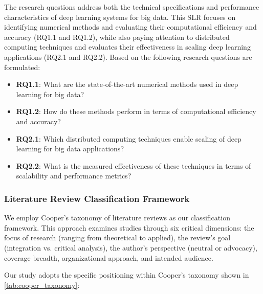 \documentclass[acmsmall]{acmart}
\begin{document}
The research questions address both the technical specifications and performance characteristics of deep learning systems for big data. This SLR focuses on identifying numerical methods and evaluating their computational efficiency and accuracy (RQ1.1 and RQ1.2), while also paying attention to distributed computing techniques and evaluates their effectiveness in scaling deep learning applications (RQ2.1 and RQ2.2). Based on the following research questions are formulated:

\begin{itemize}
    \item \textbf{RQ1.1}: What are the state-of-the-art numerical methods used in deep learning for big data?
    \item \textbf{RQ1.2}: How do these methods perform in terms of computational efficiency and accuracy?
    \item \textbf{RQ2.1}: Which distributed computing techniques enable scaling of deep learning for big data applications?
    \item \textbf{RQ2.2}: What is the measured effectiveness of these techniques in terms of scalability and performance metrics?
\end{itemize}



\subsubsection{Literature Review Classification Framework}\label{subsubsec:phase-1-planning-and-protocol-development:literature-review-classification-framework}
We employ Cooper's taxonomy of literature reviews \citep{cooper1988organizing} as our classification framework. This approach examines studies through six critical dimensions: the focus of research (ranging from theoretical to applied), the review's goal (integration vs. critical analysis), the author's perspective (neutral or advocacy), coverage breadth, organizational approach, and intended audience.

Our study adopts the specific positioning within Cooper's taxonomy shown in \cref{tab:cooper_taxonomy}:
\end{document}
